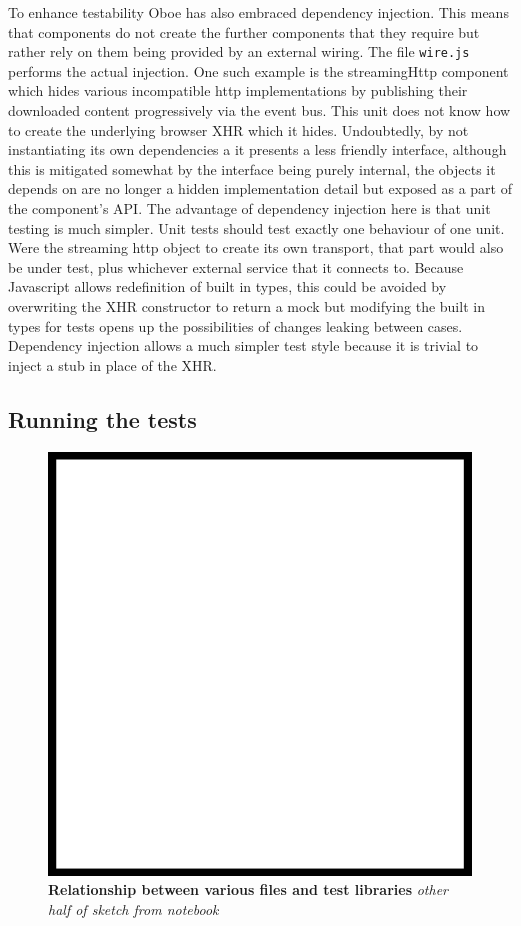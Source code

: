 \documentclass[]{article}
\makeatletter
\def\maxwidth{\ifdim\Gin@nat@width>\linewidth\linewidth
\else\Gin@nat@width\fi}
\let\Oldincludegraphics\includegraphics
\renewcommand{\includegraphics}[1]{\Oldincludegraphics[width=\maxwidth]{#1}}
\makeatother
\begin{document}
To enhance testability Oboe has also embraced dependency injection. This
means that components do not create the further components that they
require but rather rely on them being provided by an external wiring.
The file \texttt{wire.js} performs the actual injection. One such
example is the streamingHttp component which hides various incompatible
http implementations by publishing their downloaded content
progressively via the event bus. This unit does not know how to create
the underlying browser XHR which it hides. Undoubtedly, by not
instantiating its own dependencies a it presents a less friendly
interface, although this is mitigated somewhat by the interface being
purely internal, the objects it depends on are no longer a hidden
implementation detail but exposed as a part of the component's API. The
advantage of dependency injection here is that unit testing is much
simpler. Unit tests should test exactly one behaviour of one unit. Were
the streaming http object to create its own transport, that part would
also be under test, plus whichever external service that it connects to.
Because Javascript allows redefinition of built in types, this could be
avoided by overwriting the XHR constructor to return a mock but
modifying the built in types for tests opens up the possibilities of
changes leaking between cases. Dependency injection allows a much
simpler test style because it is trivial to inject a stub in place of
the XHR.

\subsection{Running the tests}

\begin{figure}[htbp]
\centering
\includegraphics{images/placeholder.png}
\caption{\textbf{Relationship between various files and test libraries}
\emph{other half of sketch from notebook}}
\end{figure}
\end{document}
